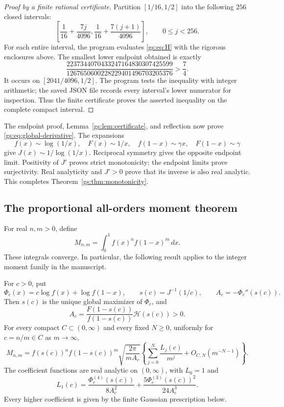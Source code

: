 \begin{proof}[Proof by a finite rational certificate]
Partition $[1/16,1/2]$ into the following $256$ closed intervals:
\[
 \left[\frac1{16}+\frac{7j}{4096},
       \frac1{16}+\frac{7(j+1)}{4096}\right],
 \qquad 0\le j<256.
\]
For each entire interval, the program evaluates
\eqref{gs:eq:H} with the rigorous enclosures above. The smallest lower
endpoint obtained is exactly
\[
 \frac{2237344070433247164830307425599}
      {1267650600228229401496703205376}
 >\frac74.
\]
It occurs on $[2041/4096,1/2]$. The program tests the inequality
with integer arithmetic; the saved JSON file records every interval's
lower numerator for inspection. Thus the finite certificate proves
the asserted inequality on the complete compact interval.
\end{proof}

The endpoint proof, Lemma~\ref{gs:lem:certificate}, and reflection now
prove \eqref{gs:eq:global-derivative}. The expansions
\[
 f(x)\sim\log(1/x),\quad F(x)\sim1/x,\quad
 f(1-x)\sim\gamma x,\quad F(1-x)\sim\gamma
\]
give $J(x)\sim1/\log(1/x)$. Reciprocal symmetry gives the opposite
endpoint limit. Positivity of $J'$ proves strict monotonicity;
the endpoint limits prove surjectivity. Real analyticity and
$J'>0$ prove that its inverse is also real analytic.
This completes Theorem~\ref{gs:thm:monotonicity}.

\subsection{The proportional all-orders moment theorem}

For real $n,m>0$, define
\[
 M_{n,m}=\int_0^1 f(x)^n f(1-x)^m\,dx.
\]
These integrals converge. In particular, the following result applies
to the integer moment family in the manuscript.

\begin{theorem}
\label{gs:thm:proportional}
For $c>0$, put
\[
 \Phi_c(x)=c\log f(x)+\log f(1-x),\qquad
 s(c)=J^{-1}(1/c),\qquad
 A_c=-\Phi_c''(s(c)).
\]
Then $s(c)$ is the unique global maximizer of $\Phi_c$, and
\begin{equation}\label{gs:eq:curvature}
 A_c=\frac{F(1-s(c))}{f(1-s(c))}\mathcal H(s(c))>0.
\end{equation}
For every compact $C\subset(0,\infty)$ and every fixed $N\ge0$,
uniformly for $c=n/m\in C$ as $m\to\infty$,
\begin{equation}\label{gs:eq:laplace}
 M_{n,m}=f(s(c))^n f(1-s(c))^m
 \sqrt{\frac{2\pi}{mA_c}}
 \left\{\sum_{j=0}^N\frac{L_j(c)}{m^j}
                 +O_{C,N}(m^{-N-1})\right\}.
\end{equation}
The coefficient functions are real analytic on $(0,\infty)$, with
$L_0=1$ and
\begin{equation}\label{gs:eq:first-correction}
 L_1(c)=\frac{\Phi_c^{(4)}(s(c))}{8A_c^2}
       +\frac{5\Phi_c^{(3)}(s(c))^2}{24A_c^3}.
\end{equation}
Every higher coefficient is given by the finite Gaussian prescription
below.
\end{theorem}


